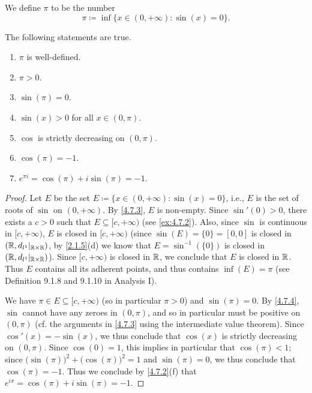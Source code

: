 \begin{defn}\label{4.7.4}
  We define \(\pi\) to be the number
  \[
    \pi \coloneqq \inf\{x \in (0, +\infty) : \sin(x) = 0\}.
  \]
\end{defn}

\begin{ac}\label{ac:4.7.2}
  The following statements are true.
  \begin{enumerate}
    \item \(\pi\) is well-defined.
    \item \(\pi > 0\).
    \item \(\sin(\pi) = 0\).
    \item \(\sin(x) > 0\) for all \(x \in (0, \pi)\).
    \item \(\cos\) is strictly decreasing on \((0, \pi)\).
    \item \(\cos(\pi) = -1\).
    \item \(e^{\pi i} = \cos(\pi) + i \sin(\pi) = -1\).
  \end{enumerate}
\end{ac}

\begin{proof}
  Let \(E\) be the set \(E \coloneqq \{x \in (0, +\infty) : \sin(x) = 0\}\), i.e., \(E\) is the set of roots of \(\sin\) on \((0, +\infty)\).
  By \cref{4.7.3}, \(E\) is non-empty.
  Since \(\sin'(0) > 0\), there exists a \(c > 0\) such that \(E \subseteq [c, +\infty)\) (see \cref{ex:4.7.2}).
  Also, since \(\sin\) is continuous in \([c, +\infty)\), \(E\) is closed in \([c, +\infty)\)
  (since \(\sin(E) = \{0\} = [0, 0]\) is closed in \((\mathbb{R}, d_{l^1}|_{\mathbb{R} \times \mathbb{R}})\), by \cref{2.1.5}(d) we know that \(E = \sin^{-1}(\{0\})\) is closed in \((\mathbb{R}, d_{l^1}|_{\mathbb{R} \times \mathbb{R}})\)).
  Since \([c, +\infty)\) is closed in \(\mathbb{R}\), we conclude that \(E\) is closed in \(\mathbb{R}\).
  Thus \(E\) contains all its adherent points, and thus contains \(\inf(E) = \pi\) (see Definition 9.1.8 and 9.1.10 in Analysis I).

  We have \(\pi \in E \subseteq [c, +\infty)\) (so in particular \(\pi > 0\)) and \(\sin(\pi) = 0\).
  By \cref{4.7.4}, \(\sin\) cannot have any zeroes in \((0, \pi)\), and so in particular must be positive on \((0, \pi)\)
  (cf. the arguments in \cref{4.7.3} using the intermediate value theorem).
  Since \(\cos'(x) = -\sin(x)\), we thus conclude that \(\cos(x)\) is strictly decreasing on \((0, \pi)\).
  Since \(\cos(0) = 1\), this implies in particular that \(\cos(\pi) < 1\);
  since \(\big(\sin(\pi)\big)^2 + \big(\cos(\pi)\big)^2 = 1\) and \(\sin(\pi) = 0\), we thus conclude that \(\cos(\pi) = -1\).
  Thus we conclude by \cref{4.7.2}(f) that \(e^{i \pi} = \cos(\pi) + i \sin(\pi) = -1\).
\end{proof}

